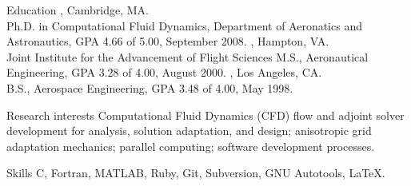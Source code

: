 \documentclass{resume}
\author{Michael Andrew Park}
\begin{document}
\maketitle


\begin{category}{Education}
, Cambridge, MA.\\
Ph.D. in Computational Fluid Dynamics, Department of Aeronatics and Astronautics,  GPA 4.66 of 5.00, September 2008.
, Hampton, VA.\\
Joint Institute for the Advancement of Flight Sciences
M.S., Aeronautical Engineering, GPA 3.28 of 4.00, August 2000.
, Los Angeles, CA.\\
B.S., Aerospace Engineering, GPA 3.48 of 4.00, May 1998.
\end{category}


\begin{category}{Research interests}
\citemnobullet 
Computational Fluid Dynamics (CFD) flow and adjoint
solver development for analysis, solution adaptation, and design;
anisotropic grid adaptation mechanics; parallel computing; software
development processes.
\end{category}

\begin{category}{Skills}
\citemnobullet 
C, Fortran, MATLAB, Ruby, Git, Subversion, GNU Autotools, \LaTeX.
\end{category}
\end{document}

